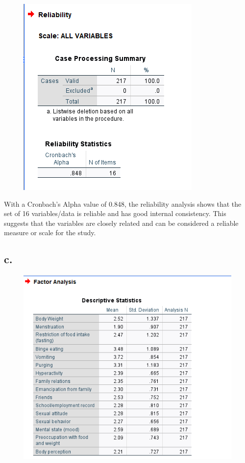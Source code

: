 \documentclass[english,10pt,a4paper]{article}
\begin{document}
\begin{figure}[h]
	
	\includegraphics[width=0.2\textheight]{Reliability.png}
\end{figure}

 With a Cronbach's Alpha value of 0.848, the reliability analysis shows that the set of 16 variables/data is reliable and  has good internal consistency. This suggests that the variables are closely related and can be considered a reliable measure or scale for the study.




 \subsection*{c.}

\begin{figure}[h]
	
	\includegraphics[width=1\linewidth]{Descriptives.png}

	\end{figure}
\end{document}
